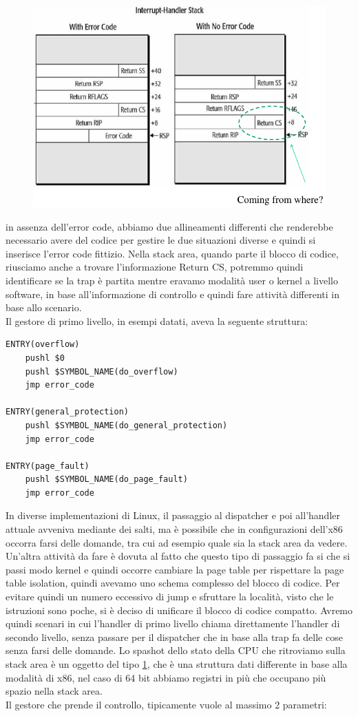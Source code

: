 \documentclass[12pt, oneside]{extbook}
\begin{document}
\begin{figure}[!h]
	\includegraphics[scale=0.4]{immagini/interrupt_stacks.png}
	\label{interrupt_stacks}
\end{figure}
in assenza dell'error code, abbiamo due allineamenti differenti che renderebbe necessario avere del codice per gestire le due situazioni diverse e quindi si inserisce l'error code fittizio. Nella stack area, quando parte il blocco di codice, riusciamo anche a trovare l'informazione Return CS, potremmo quindi identificare se la trap è partita mentre eravamo modalità user o kernel a livello software, in base all'informazione di controllo e quindi fare attività differenti in base allo scenario.\\Il gestore di primo livello, in esempi datati, aveva la seguente struttura:
\begin{lstlisting}
ENTRY(overflow)
	pushl $0
	pushl $SYMBOL_NAME(do_overflow)
	jmp error_code

ENTRY(general_protection)
	pushl $SYMBOL_NAME(do_general_protection)
	jmp error_code
	
ENTRY(page_fault)
	pushl $SYMBOL_NAME(do_page_fault)
	jmp error_code
\end{lstlisting}
In diverse implementazioni di Linux, il passaggio al dispatcher e poi all'handler attuale avveniva mediante dei salti, ma è possibile che in configurazioni dell'x86 occorra farsi delle domande, tra cui ad esempio quale sia la stack area da vedere.\\Un'altra attività da fare è dovuta al fatto che questo tipo di passaggio fa si che si passi modo kernel e quindi occorre cambiare la page table per rispettare la page table isolation, quindi avevamo uno schema complesso del blocco di codice. Per evitare quindi un numero eccessivo di jump e sfruttare la località, visto che le istruzioni sono poche, si è deciso di unificare il blocco di codice compatto. Avremo quindi scenari in cui l'handler di primo livello chiama direttamente l'handler di secondo livello, senza passare per il dispatcher che in base alla trap fa delle cose senza farsi delle domande. Lo spashot dello stato della CPU che ritroviamo sulla stack area è un oggetto del tipo \ref{interrupt_stacks}, che è una struttura dati differente in base alla modalità di x86, nel caso di 64 bit abbiamo registri in più che occupano più spazio nella stack area.\\Il gestore che prende il controllo, tipicamente vuole al massimo 2 parametri:
\end{document}
